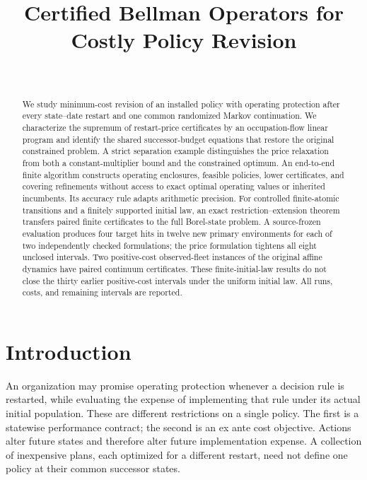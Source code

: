 

\begin{frontmatter}
\title{Certified Bellman Operators for Costly Policy Revision}
\begin{aug}\author[id=au1,addressref={add1}]{~}\address[id=add1]{}\end{aug}
\begin{abstract}
We study minimum-cost revision of an installed policy with operating protection after every state--date restart and one common randomized Markov continuation. We characterize the supremum of restart-price certificates by an occupation-flow linear program and identify the shared successor-budget equations that restore the original constrained problem. A strict separation example distinguishes the price relaxation from both a constant-multiplier bound and the constrained optimum. An end-to-end finite algorithm constructs operating enclosures, feasible policies, lower certificates, and covering refinements without access to exact optimal operating values or inherited incumbents. Its accuracy rule adapts arithmetic precision. For controlled finite-atomic transitions and a finitely supported initial law, an exact restriction--extension theorem transfers paired finite certificates to the full Borel-state problem. A source-frozen evaluation produces four target hits in twelve new primary environments for each of two independently checked formulations; the price formulation tightens all eight unclosed intervals. Two positive-cost observed-fleet instances of the original affine dynamics have paired continuum certificates. These finite-initial-law results do not close the thirty earlier positive-cost intervals under the uniform initial law. All runs, costs, and remaining intervals are reported.
\end{abstract}
\begin{keyword}\end{keyword}
\end{frontmatter}

\section{Introduction}\label{sec:intro48}
An organization may promise operating protection whenever a decision rule is restarted, while evaluating the expense of implementing that rule under its actual initial population. These are different restrictions on a single policy. The first is a statewise performance contract; the second is an ex ante cost objective. Actions alter future states and therefore alter future implementation expense. A collection of inexpensive plans, each optimized for a different restart, need not define one policy at their common successor states.

